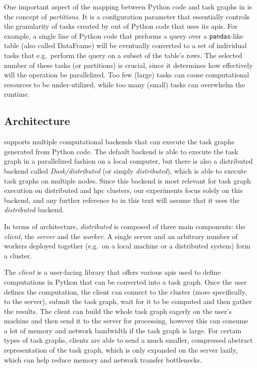 One important aspect of the mapping between Python code and task graphs in
\dask{} is the concept of \emph{partitions}. It is a configuration
parameter that essentially controls the granularity of tasks created by \dask{}
out of Python code that uses its \glspl{api}. For example, a single line of Python
code that performs a query over a \texttt{pandas}-like table (also called DataFrame)
will be eventually converted to a set of individual tasks that e.g.\ perform the query on a subset
of the table's rows. The selected number of these tasks (or partitions) is crucial, since it
determines how effectively will the operation be parallelized. Too few (large) tasks can cause
computational resources to be under-utilized, while too many (small) tasks can overwhelm the
\dask{} runtime.

\subsection*{Architecture}
\dask{} supports multiple computational backends that can execute the task
graphs generated from Python code. The default backend is able to execute the task graph in a
parallelized fashion on a local computer, but there is also a distributed backend called
\emph{Dask/distributed}
(or simply \emph{distributed}), which is able to execute task graphs on
multiple nodes. Since this backend is most relevant for task graph execution on distributed and
\gls{hpc} clusters, our experiments focus solely on this backend, and any further
reference to \dask{} in this text will assume that it uses the
\emph{distributed} backend.

In terms of architecture, \emph{distributed} is composed of three main components: the
\emph{client}, the \emph{server} and the \emph{worker}. A
single server and an arbitrary number of workers deployed together (e.g.\ on a local machine or a
distributed system) form a \dask{} cluster.

The \emph{client} is a user-facing library that offers various
\glspl{api} used to define computations in Python that can be converted into a task
graph. Once the user defines the computation, the client can connect to the
\dask{} cluster (more specifically, to the server), submit the task graph, wait
for it to be computed and then gather the results. The client can build the whole task graph
eagerly on the user's machine and then send it to the server for processing, however this can
consume a lot of memory and network bandwidth if the task graph is large. For certain types of task
graphs, clients are able to send a much smaller, compressed abstract representation of the task
graph, which is only expanded on the server lazily, which can help reduce memory and network
transfer bottlenecks.


